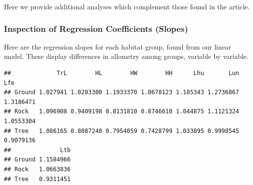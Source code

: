 \documentclass[
  11pt,
]{article}
\newenvironment{Shaded}{\begin{snugshade}}{\end{snugshade}}
\newcommand{\AttributeTok}[1]{\textcolor[rgb]{0.77,0.63,0.00}{#1}}
\newcommand{\CommentTok}[1]{\textcolor[rgb]{0.56,0.35,0.01}{\textit{#1}}}
\newcommand{\DecValTok}[1]{\textcolor[rgb]{0.00,0.00,0.81}{#1}}
\newcommand{\FunctionTok}[1]{\textcolor[rgb]{0.00,0.00,0.00}{#1}}
\newcommand{\NormalTok}[1]{#1}
\newcommand{\OtherTok}[1]{\textcolor[rgb]{0.56,0.35,0.01}{#1}}
\newcommand{\SpecialCharTok}[1]{\textcolor[rgb]{0.00,0.00,0.00}{#1}}
\newcommand{\StringTok}[1]{\textcolor[rgb]{0.31,0.60,0.02}{#1}}
\begin{document}
Here we provide additional analyses which complement those found in the
article.

\hypertarget{inspection-of-regression-coefficients-slopes}{%
\subsubsection{Inspection of Regression Coefficients
(Slopes)}\label{inspection-of-regression-coefficients-slopes}}

Here are the regression slopes for each habitat group, found from our
linear model. These display differences in allometry among groups,
variable by variable.

\begin{Shaded}
\end{Shaded}

\begin{verbatim}
##             TrL        HL        HW        HH      Lhu       Lun       Lfe
## Ground 1.027941 1.0283300 1.1933370 1.0678123 1.185343 1.2736867 1.3186471
## Rock   1.096908 0.9409198 0.8131810 0.8746610 1.044875 1.1121324 1.0553304
## Tree   1.086165 0.8087240 0.7954059 0.7428799 1.033895 0.9998545 0.9079136
##              Ltb
## Ground 1.1584966
## Rock   1.0663836
## Tree   0.9311451
\end{verbatim}

\newpage
\end{document}
